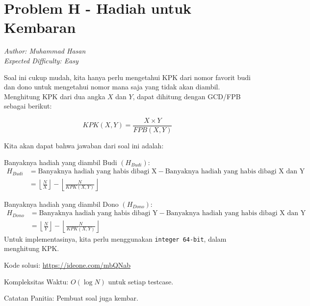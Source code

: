\section*{Problem H - Hadiah untuk Kembaran}
\textit{Author: Muhammad Hasan}
\\
\textit{Expected Difficulty: Easy}

Soal ini cukup mudah, kita hanya perlu mengetahui KPK dari nomor favorit budi dan dono untuk mengetahui nomor mana saja yang tidak akan diambil. Menghitung KPK dari dua angka $X$ dan $Y$, dapat dihitung dengan GCD/FPB sebagai berikut:

$$ KPK(X, Y) = \frac{X \times Y}{FPB(X, Y)}$$

Kita akan dapat bahwa jawaban dari soal ini adalah:

Banyaknya hadiah yang diambil Budi $(H_{Budi})$:
\begin{align*}  
    H_{Budi} &= \text{Banyaknya hadiah yang habis dibagi X} - \text{Banyaknya hadiah yang habis dibagi X dan Y} \\
    &= \left \lfloor \frac{N}{X} \right \rfloor - \left \lfloor \frac{N}{KPK(X, Y)} \right \rfloor
\end{align*}

Banyaknya hadiah yang diambil Dono $(H_{Dono})$:
\begin{align*}  
    H_{Dono} &= \text{Banyaknya hadiah yang habis dibagi Y} - \text{Banyaknya hadiah yang habis dibagi X dan Y} \\
    &= \left \lfloor \frac{N}{Y} \right \rfloor - \left \lfloor \frac{N}{KPK(X, Y)} \right \rfloor
\end{align*}
Untuk implementasinya, kita perlu menggunakan
\lstinline|integer 64-bit|, dalam menghitung KPK.

Kode solusi: \url{https://ideone.com/mbQNab}

Kompleksitas Waktu: $O(\log N)$ untuk setiap testcase.

Catatan Panitia: Pembuat soal juga kembar.